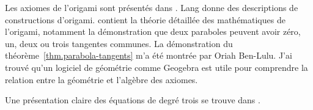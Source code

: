 Les axiomes de l'origami sont présentés dans \cite{wiki:hh-axioms}. Lang \cite{lang} donne des descriptions de constructions d'origami. 
\cite[chap.~10]{martin} contient la théorie détaillée des mathématiques de l'origami, notamment la démonstration que deux paraboles peuvent avoir zéro, un, deux ou trois tangentes communes. La démonstration du théorème~\ref{thm.parabola-tangents} m'a été montrée par Oriah Ben-Lulu. J'ai trouvé qu'un logiciel de géométrie comme {Geogebra} est utile pour comprendre la relation entre la géométrie et l'algèbre des axiomes.

Une présentation claire des équations de degré trois se trouve  dans \cite[chap.~1 et 2]{jorg}.
